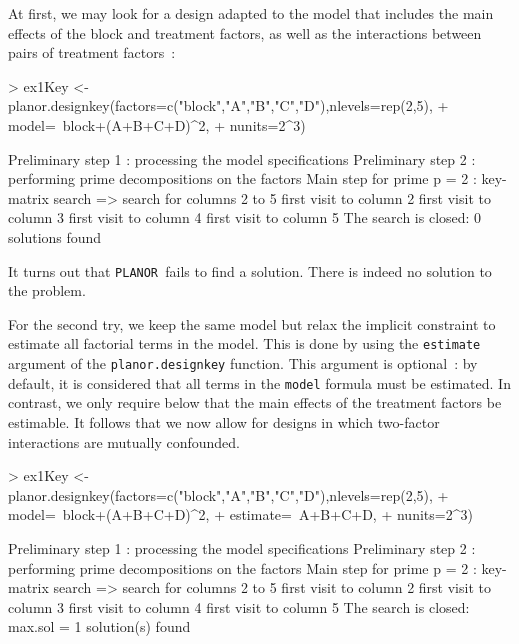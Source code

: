 \documentclass[a4paper]{article}
\newcommand{\PLANOR}{\texttt{PLANOR }}
\begin{document}
At first, we may look for a design adapted to the model that includes
the main effects of the block and treatment factors, as well as the
interactions between pairs of treatment factors~:
\begin{Schunk}
\begin{Sinput}
> ex1Key <- planor.designkey(factors=c("block","A","B","C","D"),nlevels=rep(2,5), 
+                            model=~block+(A+B+C+D)^2, 
+                            nunits=2^3)
\end{Sinput}
\begin{Soutput}
Preliminary step 1 : processing the model specifications
Preliminary step 2 : performing prime decompositions on the factors
Main step for prime p = 2 : key-matrix search
  => search for columns 2 to 5 
      first visit to column 2 
      first visit to column 3 
      first visit to column 4 
      first visit to column 5 
The search is closed:  0 solutions found 
\end{Soutput}
\end{Schunk}
It turns out that \PLANOR fails to find a solution. There is indeed
no solution to the problem.

For the second try, we keep the same model but relax the implicit
constraint to estimate all factorial terms in the model. This is done
by using the \texttt{estimate} argument of the
\texttt{planor.designkey} function. This argument is optional~: by
default, it is considered that all terms in the \texttt{model} formula
must be estimated. In contrast, we only require below that the main
effects of the treatment factors be estimable. It follows that we now
allow for designs in which two-factor interactions are mutually
confounded.
\begin{Schunk}
\begin{Sinput}
> ex1Key <- planor.designkey(factors=c("block","A","B","C","D"),nlevels=rep(2,5), 
+                            model=~block+(A+B+C+D)^2, 
+                            estimate=~A+B+C+D, 
+                            nunits=2^3)
\end{Sinput}
\begin{Soutput}
Preliminary step 1 : processing the model specifications
Preliminary step 2 : performing prime decompositions on the factors
Main step for prime p = 2 : key-matrix search
  => search for columns 2 to 5 
      first visit to column 2 
      first visit to column 3 
      first visit to column 4 
      first visit to column 5 
The search is closed: max.sol =  1 solution(s) found 
\end{Soutput}
\end{Schunk}
\end{document}
